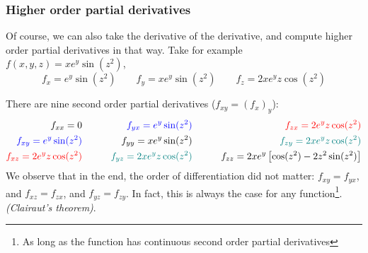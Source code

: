 \begin{frame}
\frametitle{Higher order partial derivatives}

Of course, we can also take the derivative of the derivative, and compute higher order partial derivatives in that way. Take for example $f(x,y,z)=xe^y\sin(z^2)$,
\[f_x = e^y\sin(z^2)\qquad f_y=xe^y\sin(z^2)\qquad f_z=2xe^y z\cos(z^2)\]

There are nine second order partial derivatives ($f_{xy}=(f_x)_y$):
{\footnotesize\begin{align*}
    f_{xx} = 0 \qquad&& \textcolor{blue}{f_{yx} = e^y\sin(z^2)} \qquad&& \textcolor{red}{f_{zx} = 2e^y z\cos(z^2)}\\
    \textcolor{blue}{f_{xy} = e^y\sin(z^2)} \qquad&& f_{yy} = xe^y\sin(z^2)\qquad&& \textcolor{teal}{f_{zy} =  2xe^y z\cos(z^2)} \\
    \textcolor{red}{f_{xz} = 2e^y z\cos(z^2)}\qquad&& \textcolor{teal}{f_{yz} = 2xe^y z\cos(z^2)} \qquad&& f_{zz} = 2xe^y\left[\cos(z^2)-2z^2\sin(z^2)\right]
\end{align*}}
We observe that in the end, the order of differentiation did not matter: $f_{xy}=f_{yx}$, and $f_{xz}=f_{zx}$, and $f_{yz}=f_{zy}$. In fact, this is always the case for any function\footnote{As long as the function has continuous second order partial derivatives}. \textit{(Clairaut's theorem)}.

\end{frame}



